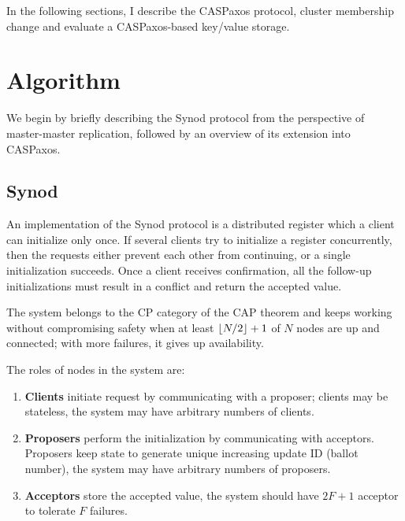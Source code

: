 \documentclass[12pt]{article}
\theoremstyle{definition}
\DeclarePairedDelimiter{\floor}{\lfloor}{\rfloor}
\begin{document}
In the following sections, I describe the CASPaxos protocol, cluster membership change and evaluate a CASPaxos-based key/value storage.

\section{Algorithm}

We begin by briefly describing the Synod protocol from the perspective of master-master replication, followed by an overview of its extension into CASPaxos.

\subsection{Synod}

An implementation of the Synod protocol is a distributed register which a client can initialize only once. If several clients try to initialize a register concurrently, then the requests either prevent each other from continuing, or a single initialization succeeds. Once a client receives confirmation, all the follow-up initializations must result in a conflict and return the accepted value.

The system belongs to the CP category of the CAP theorem and keeps working without compromising safety when at least $\floor{N/2} + 1$ of $N$ nodes are up and connected; with more failures, it gives up availability.

The roles of nodes in the system are:
\begin{enumerate}
  \item {\bf Clients} initiate request by communicating with a proposer; clients may be stateless, the system may have arbitrary numbers of clients.
  \item {\bf Proposers} perform the initialization by communicating with acceptors. Proposers keep state to generate unique increasing update ID (ballot number), the system may have arbitrary numbers of proposers.
  \item {\bf Acceptors} store the accepted value, the system should have $2F+1$ acceptor to tolerate $F$ failures.
\end{enumerate}
\end{document}
